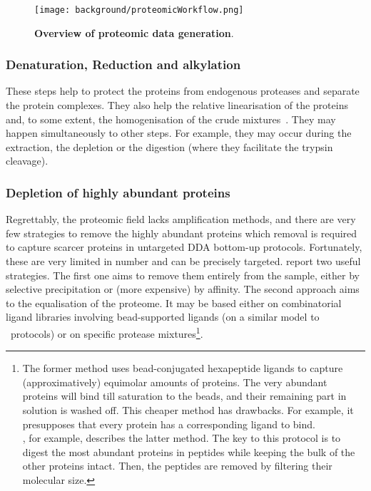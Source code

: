 \begin{figure}[!htb]
    \texttt{[image: background/proteomicWorkflow.png]}\centering
    \caption[Overview of proteomic data generation]{\label{fig:proteomics}%
    \textbf{Overview of proteomic data generation}.}
\end{figure}

\subsubsection{Denaturation, Reduction and alkylation}

These steps help to protect the proteins
from endogenous proteases and separate the protein complexes.
They also help the relative linearisation of the proteins and, to some extent,
the homogenisation of the crude mixtures~.
They may happen simultaneously to other steps.
For example, they may occur during the extraction, the depletion
or the digestion (where they facilitate the trypsin cleavage).\mybr\

\subsubsection{Depletion of highly abundant proteins}

Regrettably, the proteomic field lacks amplification methods,
and there are very few strategies to remove the highly abundant proteins
which removal is required to
capture scarcer proteins in untargeted \gls{DDA} bottom-up protocols.
Fortunately, these are very limited in number and can be precisely targeted.
\citet{Zhang2014} report two useful strategies. The first one aims to remove
them entirely from the sample, either by selective
precipitation or (more expensive) by affinity.
The second approach aims to the equalisation of the proteome.
It may be based either on combinatorial ligand libraries involving
bead-supported ligands (on a similar model to \Rnaseq\ protocols)
or on specific protease mixtures\footnote{The former method uses bead-conjugated
hexapeptide ligands to capture (approximatively) equimolar amounts of proteins.
The very abundant proteins will bind till saturation to the beads, and their
remaining part in solution is washed off. This cheaper method has drawbacks.
For example, it presupposes that every protein has a corresponding ligand to bind.
\\\citet{MichaelMentenDepletion}, for example, describes the latter method. The
key to this protocol is to digest the most abundant proteins in peptides while
keeping the bulk of the other proteins intact.
Then, the peptides are removed by filtering their molecular size.}.\mybr\

